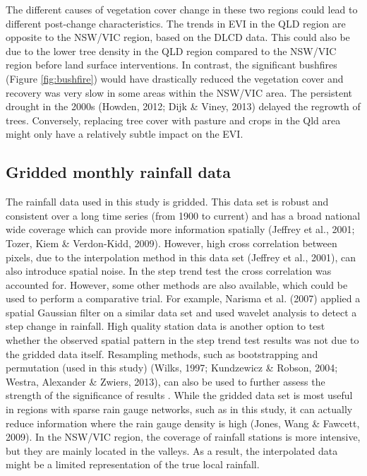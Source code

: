 \documentclass[fleqn,10pt,lineno]{wlpeerj} %
\theoremstyle{definition}
\theoremstyle{definition}
\theoremstyle{definition}
\theoremstyle{remark}
\begin{document}
The different causes of vegetation cover change in these two regions
could lead to different post-change characteristics. The trends in EVI
in the QLD region are opposite to the NSW/VIC region, based on the DLCD
data. This could also be due to the lower tree density in the QLD region
compared to the NSW/VIC region before land surface interventions. In
contrast, the significant bushfires (Figure \ref{fig:bushfire}) would
have drastically reduced the vegetation cover and recovery was very slow
in some areas within the NSW/VIC area. The persistent drought in the
2000s (Howden, 2012; Dijk \& Viney, 2013) delayed the regrowth of trees.
Conversely, replacing tree cover with pasture and crops in the Qld area
might only have a relatively subtle impact on the EVI.

\subsection{Gridded monthly rainfall
data}\label{gridded-monthly-rainfall-data}

The rainfall data used in this study is gridded. This data set is robust
and consistent over a long time series (from 1900 to current) and has a
broad national wide coverage which can provide more information
spatially (Jeffrey et al., 2001; Tozer, Kiem \& Verdon-Kidd, 2009).
However, high cross correlation between pixels, due to the interpolation
method in this data set (Jeffrey et al., 2001), can also introduce
spatial noise. In the step trend test the cross correlation was
accounted for. However, some other methods are also available, which
could be used to perform a comparative trial. For example, Narisma et
al. (2007) applied a spatial Gaussian filter on a similar data set and
used wavelet analysis to detect a step change in rainfall. High quality
station data is another option to test whether the observed spatial
pattern in the step trend test results was not due to the gridded data
itself. Resampling methods, such as bootstrapping and permutation (used
in this study) (Wilks, 1997; Kundzewicz \& Robson, 2004; Westra,
Alexander \& Zwiers, 2013), can also be used to further assess the
strength of the significance of results . While the gridded data set is
most useful in regions with sparse rain gauge networks, such as in this
study, it can actually reduce information where the rain gauge density
is high (Jones, Wang \& Fawcett, 2009). In the NSW/VIC region, the
coverage of rainfall stations is more intensive, but they are mainly
located in the valleys. As a result, the interpolated data might be a
limited representation of the true local rainfall.
\end{document}

